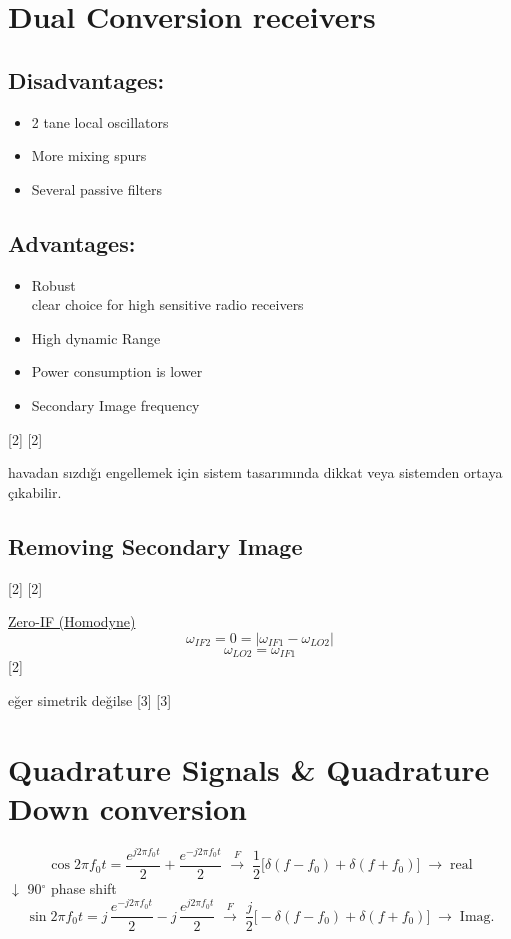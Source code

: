 \documentclass[11pt,a4paper]{article}
\begin{document}
\section{Dual Conversion receivers}

\subsection{Disadvantages:}
\begin{itemize}
\item 2 tane local oscillators
\item More mixing spurs
\item Several passive filters
\end{itemize}

\subsection{Advantages:}
\begin{itemize}
\item Robust\\
clear choice for high sensitive radio receivers
\item High dynamic Range
\item Power consumption is lower
\item Secondary Image frequency
\end{itemize}

[2]
[2]

havadan sızdığı engellemek için sistem tasarımında dikkat veya sistemden ortaya çıkabilir.

\subsection{Removing Secondary Image}
[2]
[2]

\underline{Zero-IF (Homodyne)}
\[ \omega_{IF2} = 0 = |\omega_{IF1} - \omega_{LO2}| \]
\[ \omega_{LO2} = \omega_{IF1} \]
[2]

eğer simetrik değilse
[3]
[3]

\section{Quadrature Signals \& Quadrature Down conversion}
\[ \cos 2\pi f_0 t = \frac{e^{j2\pi f_0 t}}{2} + \frac{e^{-j2\pi f_0 t}}{2} \;\overset{F}{\longrightarrow}\; \frac12\bigl[\delta(f-f_0)+\delta(f+f_0)\bigr] \;\rightarrow\; \text{real} \]
\hfill $\downarrow$ 90$^\circ$ phase shift
\[ \sin 2\pi f_0 t = j\,\frac{e^{-j2\pi f_0 t}}{2} - j\,\frac{e^{j2\pi f_0 t}}{2} \;\overset{F}{\longrightarrow}\; \frac{j}{2}\bigl[-\delta(f-f_0)+\delta(f+f_0)\bigr] \;\rightarrow\; \text{Imag.} \]
\end{document}
